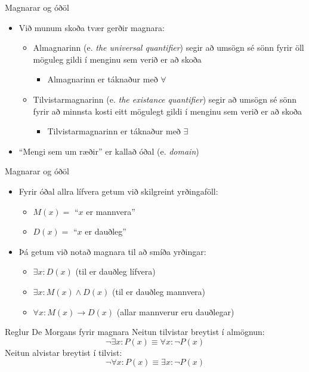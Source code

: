 \documentclass[handout]{beamer}
\begin{document}
\begin{frame}{Magnarar og óðöl}
\begin{itemize}
 \item Við munum skoða tvær gerðir magnara:
 \begin{itemize}
  \item Almagnarinn (e. \emph{the universal quantifier}) segir að umsögn sé sönn fyrir öll möguleg gildi í menginu sem verið er að skoða
  \begin{itemize}
   \item Almagnarinn er táknaður með $\forall$
  \end{itemize}
  \item Tilvistarmagnarinn (e. \emph{the existance quantifier}) segir að umsögn sé sönn fyrir að minnsta kosti eitt mögulegt gildi í menginu sem verið er að skoða
  \begin{itemize}
   \item Tilvistarmagnarinn er táknaður með $\exists$
  \end{itemize}
 \end{itemize}
 \item ``Mengi sem um ræðir'' er kallað óðal (e. \emph{domain})
\end{itemize}
\end{frame}

\begin{frame}{Magnarar og óðöl}
\begin{itemize}
 \item Fyrir óðal allra lífvera getum við skilgreint yrðingaföll:
 \begin{itemize}
  \item $M(x) = $ ``$x$ er mannvera''
  \item $D(x) = $ ``$x$ er dauðleg''
 \end{itemize}
 \item Þá getum við notað magnara til að smíða yrðingar:
 \begin{itemize}
  \item $\exists x: D(x)$ (til er dauðleg lífvera)
  \item $\exists x: M(x) \land D(x)$ (til er dauðleg mannvera) \pause
  \item $\forall x: M(x) \to D(x)$ (allar mannverur eru dauðlegar)
 \end{itemize}
\end{itemize}
\end{frame}

\begin{frame}{Reglur De Morgans fyrir magnara}
Neitun tilvistar breytist í almögnun:
\[
 \lnot \exists x: P(x) \equiv \forall x: \lnot P(x)
\]
Neitun alvistar breytist í tilvist:
\[
 \lnot \forall x: P(x) \equiv \exists x: \lnot P(x)
\]
\end{frame}
\end{document}

